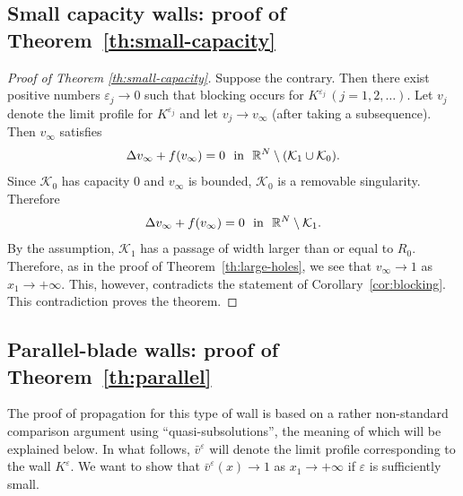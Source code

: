 \documentclass[a4paper,12pt,fullpage]{article}
\numberwithin{equation}{section}
\def\R{{\mathbb R}}
\def\ep{\varepsilon}
\begin{document}

\subsection{Small capacity walls: proof of Theorem~\ref{th:small-capacity}}\label{ss:proof-small-capacity}

\begin{proof}[Proof of Theorem \ref{th:small-capacity}]
Suppose the contrary. Then there exist positive numbers $\ep_j\to 0$ such that blocking occurs for $K^{\ep_j}\,(j=1,2,\ldots)$. Let $v_j$ denote the limit profile for $K^{\ep_j}$ and let $v_j\to v_\infty$ (after taking a subsequence). Then $v_\infty$ satisfies 
\[
\Delta v_\infty+f(v_\infty)=0 \ \ \hbox{in}\ \ \R^N\setminus ({\mathcal K}_1\cup {\mathcal K}_0).
\]
Since ${\mathcal K}_0$ has capacity $0$ and $v_\infty$ is bounded, ${\mathcal K}_0$ is a removable singularity. Therefore
\[
\Delta v_\infty+f(v_\infty)=0 \ \ \hbox{in}\ \ \R^N\setminus{\mathcal K}_1.
\]
By the assumption, ${\mathcal K}_1$ has a passage of width larger than or equal to $R_0$. Therefore, as in the proof of Theorem~\ref{th:large-holes}, we see that $v_\infty \to 1$ as $x_1\to+\infty$. This, however, contradicts the statement of Corollary~\ref{cor:blocking}. This contradiction proves the theorem.
\end{proof}


\subsection{Parallel-blade walls: proof of Theorem~\ref{th:parallel}}\label{ss:proof-parallel}

The proof of propagation for this type of wall is based on a rather non-standard comparison argument using ``quasi-subsolutions'', the meaning of which will be explained below. In what follows, $\bar{v}^\ep$ will denote the limit profile corresponding to the wall $K^\ep$. We want to show that $\bar{v}^\ep(x)\to 1$ as $x_1\to+\infty$ if $\ep$ is sufficiently small.
\end{document}
